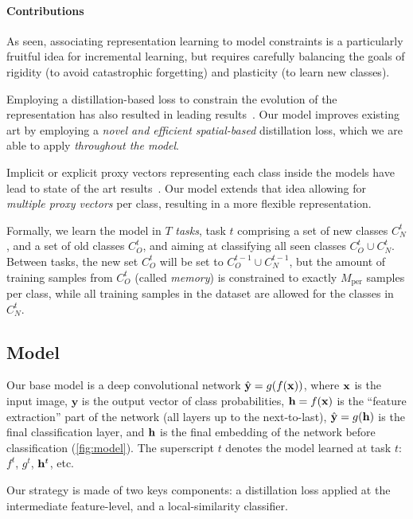 \paragraph{Contributions} As seen, associating representation learning to model constraints is a
particularly fruitful idea for incremental learning, but requires carefully balancing the goals of
rigidity (to avoid catastrophic forgetting) and plasticity (to learn new classes).

Employing a distillation-based loss to constrain the evolution of the representation has also
resulted in leading
results~\citep{hou2019ucir,wu2019bias_correction,peng2019m2kd,dhar2019learning_without_memorizing_gradcam}.
Our model improves existing art by employing a \textit{novel and efficient spatial-based}
distillation loss, which we are able to apply \textit{throughout the model}.

Implicit or explicit proxy vectors representing each class inside the models have lead to state of
the art results~\citep{rebuffi2017icarl,hou2019ucir}. Our model extends that idea allowing for
\textit{multiple proxy vectors} per class, resulting in a more flexible representation.


Formally, we learn the model in $T$ \textit{tasks}, task $t$ comprising a set of new classes
$C^t_N$, and a set of old classes $C^t_O$, and aiming at classifying all seen classes $C^t_O \cup
    C^t_N$. Between tasks, the new set $C^t_O$ will be set to $C^{t-1}_O \cup C^{t-1}_N$, but the amount
of training samples from $C^t_O$ (called \textit{memory}) is constrained to exactly $M_\mathrm{per}$
samples per class, while all training samples in the dataset are allowed for the classes in $C^t_N$.

\subsection{Model}
\label{sec:podnet_model}

Our base model is a deep convolutional network $\hat{\mathbf{y}} = g(f(\mathbf{x}))$, where $\mathbf{x}$ is the input image,
$\mathbf{y}$ is the output vector of class probabilities, $\mathbf{h} = f(\mathbf{x})$ is the ``feature
extraction'' part of the network (all layers up to the next-to-last), $\hat{\mathbf{y}} = g(\mathbf{h})$ is the final
classification layer, and $\mathbf{h}$ is the final embedding of the network before classification
(\autoref{fig:model}). The superscript $t$ denotes the model learned at task $t$:$f^{t}$, $g^{t}$,
$\mathbf{h}^{t}$, etc.

Our strategy is made of two keys components: a distillation loss applied at the intermediate
feature-level, and a local-similarity classifier.

